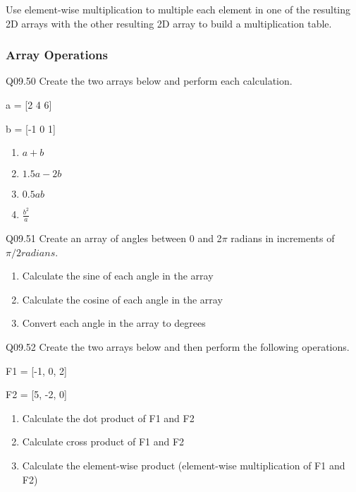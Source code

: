 \documentclass{book}
\begin{document}
Use element-wise multiplication to multiple each element in one of the
resulting 2D arrays with the other resulting 2D array to build a
multiplication table.
    




    
        \hypertarget{array-operations}{%
\subsubsection{Array Operations}\label{array-operations}}

Q09.50 Create the two arrays below and perform each calculation.

a = {[}2 4 6{]}

b = {[}-1 0 1{]}

\begin{enumerate}
\def\labelenumi{(\alph{enumi})}
\item
  \(a + b\)
\item
  \(1.5a -2b\)
\item
  \(0.5ab\)
\item
  \(\frac{b^2}{a}\)
\end{enumerate}

Q09.51 Create an array of angles between 0 and 2\(\pi\) radians in
increments of \(\pi/2 radians\).

\begin{enumerate}
\def\labelenumi{(\alph{enumi})}
\item
  Calculate the sine of each angle in the array
\item
  Calculate the cosine of each angle in the array
\item
  Convert each angle in the array to degrees
\end{enumerate}

Q09.52 Create the two arrays below and then perform the following
operations.

F1 = {[}-1, 0, 2{]}

F2 = {[}5, -2, 0{]}

\begin{enumerate}
\def\labelenumi{(\alph{enumi})}
\item
  Calculate the dot product of F1 and F2
\item
  Calculate cross product of F1 and F2
\item
  Calculate the element-wise product (element-wise multiplication of F1
  and F2)
\end{enumerate}
    
\end{document}
